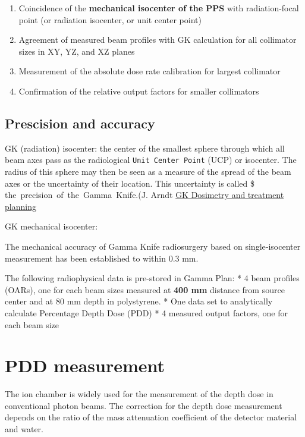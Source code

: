 \documentclass[]{book}
\providecommand{\tightlist}{%
  \setlength{\itemsep}{0pt}\setlength{\parskip}{0pt}}
\theoremstyle{definition}
\theoremstyle{definition}
\theoremstyle{definition}
\theoremstyle{remark}
\begin{document}
\begin{enumerate}
\def\labelenumi{\arabic{enumi}.}
\tightlist
\item
  Coincidence of the \textbf{mechanical isocenter of the PPS} with
  radiation-focal point (or radiation isocenter, or unit center point)
\item
  Agreement of measured beam profiles with GK calculation for all
  collimator sizes in XY, YZ, and XZ planes
\item
  Measurement of the absolute dose rate calibration for largest
  collimator
\item
  Confirmation of the relative output factors for smaller collimators
\end{enumerate}

\subsection{Prescision and accuracy}\label{prescision-and-accuracy}

GK (radiation) isocenter: the center of the smallest sphere through
which all beam axes pass as the radiological
\texttt{Unit\ Center\ Point} (UCP) or isocenter. The radius of this
sphere may then be seen as a measure of the spread of the beam axes or
the uncertainty of their location. This uncertainty is called
\$\color{Green} {the\ precision\ of\ the\ Gamma\ Knife}.(J. Arndt
\href{https://www.aapm.org/meetings/99AM/pdf/2756-33420.pdf}{GK
Dosimetry and treatment planning}

GK mechanical isocenter:

The mechanical accuracy of Gamma Knife radiosurgery based on
single‐isocenter measurement has been established to within 0.3 mm.

The following radiophysical data is pre-stored in Gamma Plan: * 4 beam
profiles (OARs), one for each beam sizes measured at \textbf{400 mm}
distance from source center and at 80 mm depth in polystyrene. * One
data set to analytically calculate Percentage Depth Dose (PDD) * 4
measured output factors, one for each beam size

\section{PDD measurement}\label{pdd-measurement}

The ion chamber is widely used for the measurement of the depth dose in
conventional photon beams. The correction for the depth dose measurement
depends on the ratio of the mass attenuation coefficient of the detector
material and water.
\end{document}
